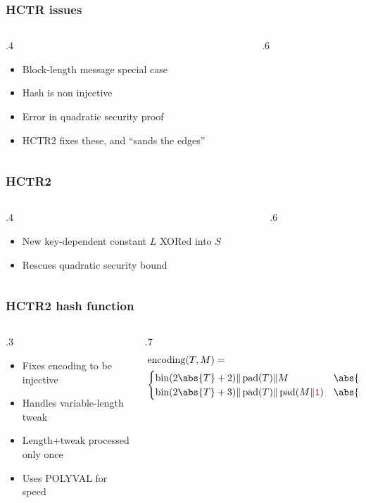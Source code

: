 \documentclass[aspectratio=169]{beamer}
\newenvironment*{figslide}{
    \begin{columns}
        \begin{column}{.4\textwidth}

}{
\end{column}
\begin{column}{.6\textwidth}
    \begin{figure}
        
    \end{figure}
\end{column}
\end{columns}
}
\begin{document}
\begin{frame}

\frametitle{HCTR issues}
\begin{figslide}
        \begin{itemize}
            \item Block-length message special case
            \item Hash is non injective
            \item Error in quadratic security proof
            \item HCTR2 fixes these, and ``sands the edges''
        \end{itemize}
\end{figslide}

\end{frame}

\togglefalse{oldhctr}

\begin{frame}

\frametitle{HCTR2}
\begin{figslide}
    \begin{itemize}
        \item New key-dependent constant \(L\) XORed into \(S\)
        \item Rescues quadratic security bound
    \end{itemize}
\end{figslide}

\end{frame}

\begin{frame}
    \frametitle{HCTR2 hash function}
    \begin{columns}
        \begin{column}{.3\textwidth}
            \begin{itemize}
                \item Fixes encoding to be injective
                \item Handles variable-length tweak
                \item Length+tweak processed only once
                \item Uses POLYVAL for speed
            \end{itemize}
        \end{column}
        \begin{column}{.7\textwidth}
            \begin{align*}
                &\operatorname{encoding}(T, M) =\\
                &\begin{cases}
                    \fromint(2\abs{T} + 2) \Concat \pad(T) \Concat M &
                    \abs{M} = 0 \pmod{n}  \\
                    \fromint(2\abs{T} + 3) \Concat \pad(T) \Concat \pad(M \Concat \bini) &
                    \abs{M} \ne 0 \pmod{n}
                \end{cases}
            \end{align*}
        \end{column}
    \end{columns}
\end{frame}
\end{document}
